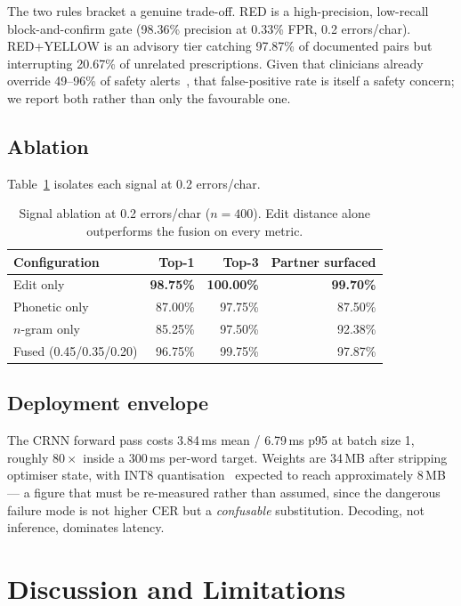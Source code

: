 \documentclass[conference]{IEEEtran}
\begin{document}
The two rules bracket a genuine trade-off. RED is a high-precision,
low-recall block-and-confirm gate (98.36\% precision at 0.33\% FPR, 0.2
errors/char). RED+YELLOW is an advisory tier catching 97.87\%
of documented pairs but interrupting 20.67\% of unrelated prescriptions. Given
that clinicians already override 49--96\% of safety
alerts~\cite{vandersijs2006override}, that false-positive rate is itself a
safety concern; we report both rather than only the favourable one.

\subsection{Ablation}
Table~\ref{tab:ablation} isolates each signal at 0.2 errors/char.

\begin{table}[t]
\caption{Signal ablation at 0.2 errors/char ($n=400$). Edit distance alone
outperforms the fusion on every metric.}
\label{tab:ablation}
\centering
\begin{tabular}{@{}lrrr@{}}
\toprule
Configuration & Top-1 & Top-3 & Partner surfaced \\
\midrule
Edit only                   & \textbf{98.75\%} & \textbf{100.00\%} & \textbf{99.70\%} \\
Phonetic only               & 87.00\% & 97.75\%  & 87.50\% \\
$n$-gram only               & 85.25\% & 97.50\%  & 92.38\% \\
Fused (0.45/0.35/0.20)      & 96.75\% & 99.75\%  & 97.87\% \\
\bottomrule
\end{tabular}
\end{table}

\subsection{Deployment envelope}
The CRNN forward pass costs 3.84\,ms mean / 6.79\,ms p95 at batch size 1,
roughly $80\times$ inside a 300\,ms per-word target. Weights are 34\,MB after
stripping optimiser state, with INT8 quantisation~\cite{jacob2018quantization}
expected to reach approximately 8\,MB --- a figure that must be re-measured
rather than assumed, since the dangerous failure mode is not higher CER but a
\emph{confusable} substitution. Decoding, not inference, dominates latency.

\section{Discussion and Limitations}\label{sec:discussion}
\end{document}
